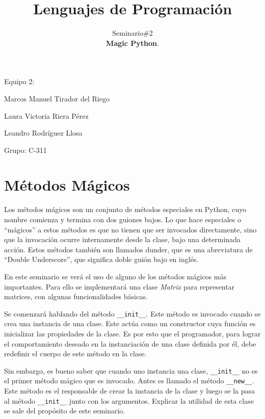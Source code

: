 \documentclass[10pt]{article}
\title{\textbf{Lenguajes de Programaci\'on}}
\author{Seminario\#2\\
 \textbf{Magic Python}.}
\date{}
\newcommand{\mgc}[1]{\texttt{\_\_#1\_\_}}
\begin{document}
	\begin{titlepage}
		\clearpage	
		\maketitle
		\begin{center}
%			
			\vspace{5em}
			Equipo 2:
			
			Marcos Manuel Tirador del Riego
			
			Laura Victoria Riera P\'erez
			
			Leandro Rodr\'iguez Llosa
			\vspace{1em}
			
			Grupo: C-311
		\end{center}
		\thispagestyle{empty}
	\end{titlepage}


\newpage
{}
\tableofcontents
\thispagestyle{empty}

\newpage
{}

\section{M\'etodos M\'agicos}

Los m\'etodos m\'agicos son un conjunto de m\'etodos especiales en Python, cuyo nombre comienza y termina con dos guiones bajos. Lo que hace especiales o ``m\'agicos'' a estos m\'etodos es que no tienen que ser invocados directamente, sino que la invocaci\'on ocurre internamente desde la clase, bajo una determinada acci\'on. Estos m\'etodos tambi\'en son llamados dunder, que es una abreviatura de ``Double Underscore'', que significa doble gui\'on bajo en ingl\'es. 

En este seminario se ver\'a el uso de alguno de los m\'etodos m\'agicos m\'as importantes. Para ello se implementar\'a una clase \emph{Matrix} para representar matrices, con algunas funcionalidades b\'asicas.

Se comenzar\'a hablando del m\'etodo \texttt{\_\_init\_\_}. Este m\'etodo es invocado cuando se crea una instancia de una clase. Este act\'ua como un constructor cuya funci\'on es inicializar las propiedades de la clase. Es por esto que el programador, para lograr el comportamiento deseado en la instanciaci\'on de una clase definida por \'el, debe redefinir el cuerpo de este m\'etodo en la clase.

Sin embargo, es bueno saber que cuando uno instancia una clase, \mgc{init} no es el primer m\'etodo m\'agico que es invocado. Antes es llamado el m\'etodo  \mgc{new}. Este m\'etodo es el responsable de crear la instancia de la clase y luego se la pasa al m\'etodo \mgc{init} junto con los argumentos. Explicar la utilidad de esta clase se sale del prop\'osito de este seminario.
\end{document}
